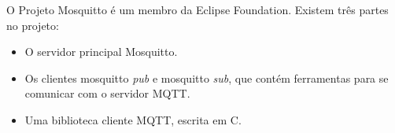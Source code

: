 O Projeto Mosquitto é um membro da Eclipse Foundation. Existem três partes no projeto:

\begin{itemize}
	\item O servidor principal Mosquitto.
	\item Os clientes mosquitto \textit{pub} e mosquitto \textit{sub}, que contém ferramentas para se comunicar com o servidor MQTT.
	\item Uma biblioteca cliente MQTT, escrita em C.
\end{itemize}

%
%
%
%
